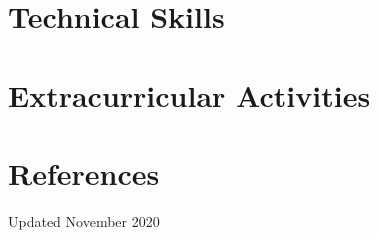 \documentclass{prometheus_cv}
\begin{document}
\section{Technical Skills}





\section{Extracurricular Activities}





\section{References}

\vfill
Updated November 2020
\end{document}
